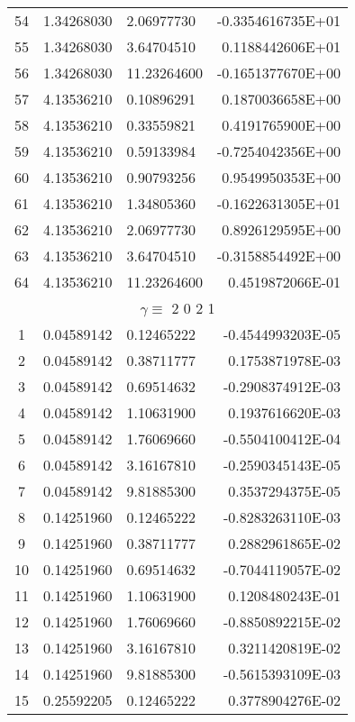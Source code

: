 \begin{longtable}{@{\extracolsep{\fill}}cllr@{}}
54  &  1.34268030  &  2.06977730  &  -0.3354616735E+01 \\
55  &  1.34268030  &  3.64704510  &   0.1188442606E+01 \\
56  &  1.34268030  &  11.23264600  &  -0.1651377670E+00 \\
57  &  4.13536210  &  0.10896291  &   0.1870036658E+00 \\
58  &  4.13536210  &  0.33559821  &   0.4191765900E+00 \\
59  &  4.13536210  &  0.59133984  &  -0.7254042356E+00 \\
60  &  4.13536210  &  0.90793256  &   0.9549950353E+00 \\
61  &  4.13536210  &  1.34805360  &  -0.1622631305E+01 \\
62  &  4.13536210  &  2.06977730  &   0.8926129595E+00 \\
63  &  4.13536210  &  3.64704510  &  -0.3158854492E+00 \\
64  &  4.13536210  &  11.23264600  &   0.4519872066E-01 \\
\midrule
\multicolumn{4}{c}{ $\gamma \equiv $  2 0 2 1} \\
\midrule
1  &  0.04589142  &  0.12465222  &  -0.4544993203E-05 \\
2  &  0.04589142  &  0.38711777  &   0.1753871978E-03 \\
3  &  0.04589142  &  0.69514632  &  -0.2908374912E-03 \\
4  &  0.04589142  &  1.10631900  &   0.1937616620E-03 \\
5  &  0.04589142  &  1.76069660  &  -0.5504100412E-04 \\
6  &  0.04589142  &  3.16167810  &  -0.2590345143E-05 \\
7  &  0.04589142  &  9.81885300  &   0.3537294375E-05 \\
8  &  0.14251960  &  0.12465222  &  -0.8283263110E-03 \\
9  &  0.14251960  &  0.38711777  &   0.2882961865E-02 \\
10  &  0.14251960  &  0.69514632  &  -0.7044119057E-02 \\
11  &  0.14251960  &  1.10631900  &   0.1208480243E-01 \\
12  &  0.14251960  &  1.76069660  &  -0.8850892215E-02 \\
13  &  0.14251960  &  3.16167810  &   0.3211420819E-02 \\
14  &  0.14251960  &  9.81885300  &  -0.5615393109E-03 \\
15  &  0.25592205  &  0.12465222  &   0.3778904276E-02 \\

\end{longtable}
